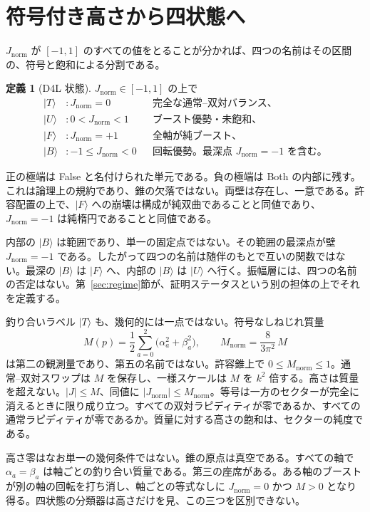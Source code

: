 \documentclass[a4paper]{article}
\theoremstyle{definition}
\newtheorem{definition}[theorem]{定義}
\newcommand{\Jnorm}{J_{\mathrm{norm}}}
\begin{document}
\section{符号付き高さから四状態へ}
\label{sec:states}

\(\Jnorm\) が \([-1,1]\) のすべての値をとることが分かれば、四つの名前はその区間の、符号と飽和による分割である。

\begin{definition}[D4L 状態]
\label{def:states}
\(\Jnorm\in[-1,1]\) の上で
\begin{align*}
\lvert T\rangle &\colon \Jnorm = 0
  &&\text{完全な通常–双対バランス、}\\
\lvert U\rangle &\colon 0 < \Jnorm < 1
  &&\text{ブースト優勢・未飽和、}\\
\lvert F\rangle &\colon \Jnorm = +1
  &&\text{全軸が純ブースト、}\\
\lvert B\rangle &\colon -1\le \Jnorm < 0
  &&\text{回転優勢。最深点 \(\Jnorm=-1\) を含む。}
\end{align*}
\end{definition}

正の極端は False と名付けられた単元である。負の極端は Both の内部に残す。これは論理上の規約であり、錐の欠落ではない。両壁は存在し、一意である。許容配置の上で、\(\lvert F\rangle\) への崩壊は構成が純双曲であることと同値であり、\(\Jnorm=-1\) は純楕円であることと同値である。

内部の \(\lvert B\rangle\) は範囲であり、単一の固定点ではない。その範囲の最深点が壁 \(\Jnorm=-1\) である。したがって四つの名前は随伴のもとで互いの関数ではない。最深の \(\lvert B\rangle\) は \(\lvert F\rangle\) へ、内部の \(\lvert B\rangle\) は \(\lvert U\rangle\) へ行く。振幅層には、四つの名前の否定はない。第~\ref{sec:regime}節が、証明ステータスという別の担体の上でそれを定義する。

釣り合いラベル \(\lvert T\rangle\) も、幾何的には一点ではない。符号なしねじれ質量
\[
M(p)=\frac12\sum_{a=0}^{2}\bigl(\alpha_a^2+\beta_a^2\bigr),\qquad
M_{\mathrm{norm}}=\frac{8}{3\pi^2}\,M
\]
は第二の観測量であり、第五の名前ではない。許容錐上で \(0\le M_{\mathrm{norm}}\le 1\)。通常–双対スワップは \(M\) を保存し、一様スケールは \(M\) を \(k^2\) 倍する。高さは質量を超えない。\(\lvert J\rvert\le M\)、同値に \(\lvert\Jnorm\rvert\le M_{\mathrm{norm}}\)。等号は一方のセクターが完全に消えるときに限り成り立つ。すべての双対ラピディティが零であるか、すべての通常ラピディティが零であるか。質量に対する高さの飽和は、セクターの純度である。

高さ零はなお単一の幾何条件ではない。錐の原点は真空である。すべての軸で \(\alpha_a=\beta_a\) は軸ごとの釣り合い質量である。第三の座席がある。ある軸のブーストが別の軸の回転を打ち消し、軸ごとの等式なしに \(\Jnorm=0\) かつ \(M>0\) となり得る。四状態の分類器は高さだけを見、この三つを区別できない。
\end{document}
